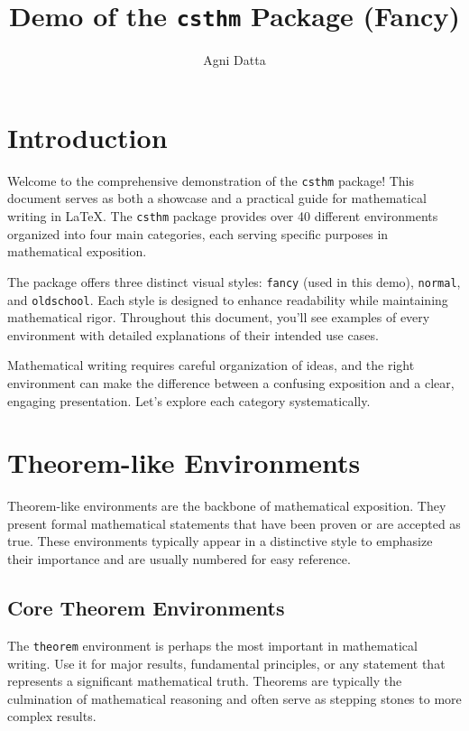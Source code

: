 \documentclass[9pt]{amsart}
\title{Demo of the \texttt{csthm} Package (Fancy)}
\author{Agni Datta}
\begin{document}
\maketitle

\tableofcontents

\section{Introduction}

Welcome to the comprehensive demonstration of the \texttt{csthm} package! This
document serves as both a showcase and a practical guide for mathematical
writing in \LaTeX. The \texttt{csthm} package provides over 40 different
environments organized into four main categories, each serving specific
purposes in mathematical exposition.

The package offers three distinct visual styles: \texttt{fancy} (used in this
demo), \texttt{normal}, and \texttt{oldschool}. Each style is designed to
enhance readability while maintaining mathematical rigor. Throughout this
document, you'll see examples of every environment with detailed explanations
of their intended use cases.

Mathematical writing requires careful organization of ideas, and the right
environment can make the difference between a confusing exposition and a clear,
engaging presentation. Let's explore each category systematically.

\section{Theorem-like Environments}

Theorem-like environments are the backbone of mathematical exposition. They
present formal mathematical statements that have been proven or are accepted as
true. These environments typically appear in a distinctive style to emphasize
their importance and are usually numbered for easy reference.

\subsection{Core Theorem Environments}

The \texttt{theorem} environment is perhaps the most important in mathematical
writing. Use it for major results, fundamental principles, or any statement
that represents a significant mathematical truth. Theorems are typically the
culmination of mathematical reasoning and often serve as stepping stones to
more complex results.
\end{document}
